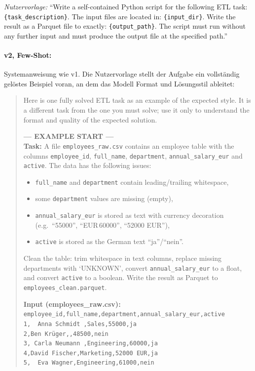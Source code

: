 \emph{Nutzervorlage:} \enquote{Write a self-contained Python script for the
following ETL task: \texttt{\{task\_description\}}. The input files are located
in: \texttt{\{input\_dir\}}. Write the result as a Parquet file to exactly:
\texttt{\{output\_path\}}. The script must run without any further input and
must produce the output file at the specified path.}

\paragraph{v2, Few-Shot:}
Systemanweisung wie v1. Die Nutzervorlage stellt der Aufgabe ein vollständig
gelöstes Beispiel voran, an dem das Modell Format und Lösungsstil ableitet:

\begin{quote}
\small
Here is one fully solved ETL task as an example of the expected style. It is a different task from the one you must solve; use it only to understand the format and quality of the expected solution.

\textbf{--- EXAMPLE START ---}\\
\textbf{Task:} A file \texttt{employees\_raw.csv} contains an employee table with the columns \texttt{employee\_id}, \texttt{full\_name}, \texttt{department}, \texttt{annual\_salary\_eur} and \texttt{active}. The data has the following issues:
\begin{itemize}
    \item \texttt{full\_name} and \texttt{department} contain leading/trailing whitespace,
    \item some \texttt{department} values are missing (empty),
    \item \texttt{annual\_salary\_eur} is stored as text with currency decoration (e.g.\ ``55000'', ``EUR\,60000'', ``52000 EUR''),
    \item \texttt{active} is stored as the German text ``ja''/``nein''.
\end{itemize}
Clean the table: trim whitespace in text columns, replace missing departments with `UNKNOWN', convert \texttt{annual\_salary\_eur} to a float, and convert \texttt{active} to a boolean. Write the result as Parquet to \texttt{employees\_clean.parquet}.

\textbf{Input (employees\_raw.csv):}\\
\texttt{employee\_id,full\_name,department,annual\_salary\_eur,active}\\
\texttt{1,\ \ Anna Schmidt\ ,Sales,55000,ja}\\
\texttt{2,Ben Krüger,,48500,nein}\\
\texttt{3,\ Carla Neumann\ ,Engineering,60000,ja}\\
\texttt{4,David Fischer,Marketing,52000 EUR,ja}\\
\texttt{5,\ \ Eva Wagner,Engineering,61000,nein}


\end{quote}
